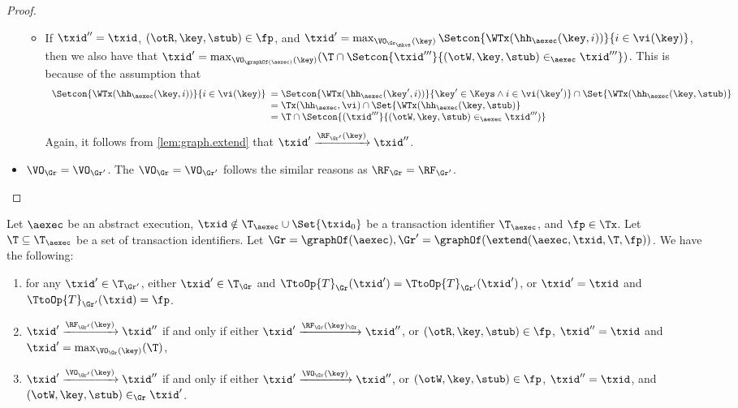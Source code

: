 \begin{proof}
\begin{itemize}
\begin{itemize}
\item If $\txid'' = \txid$, $(\otR, \key, \stub) \in \fp$, and $\txid' = \max_{\VO_{\Gr_\mkvs}(\key)} \Setcon{ \WTx(\hh_{\aexec}(\key, i)) }{ i \in \vi(\key)}$, 
    then we also have that $\txid' = \max_{\VO_{\graphOf(\aexec)}(\key)} (\T \cap \Setcon{ \txid''' }{ (\otW, \key, \stub) \in_{\aexec} \txid'''}) $. 
This is because of the assumption that 
\[
\begin{array}{l}
    \Setcon{\WTx(\hh_{\aexec}(\key, i)) }{ i \in \vi(\key)}
    \begin{array}[t]{l}
    = \Setcon{\WTx(\hh_{\aexec}(\key', i)) }{ \key' \in \Keys \wedge i \in \vi(\key')} \cap \Set{\WTx(\hh_{\aexec}(\key, \stub)} \\
= \Tx(\hh_{\aexec}, \vi) \cap \Set{\WTx(\hh_{\aexec}(\key, \stub)}  \\
= \T \cap \Setcon{(\txid''' }{ (\otW, \key, \stub) \in_{\aexec} \txid''')}
\end{array}
\end{array}
\]
Again, it follows from \cref{lem:graph.extend} that $\txid' \xrightarrow{\RF_{\Gr'}(\key)} \txid''$. 
\end{itemize}
\item \( \VO_{\Gr} = \VO_{\Gr'}\). The \( \VO_{\Gr} = \VO_{\Gr'} \) follows the similar reasons as $\RF_{\Gr} = \RF_{\Gr'}$.
\end{itemize}
\end{proof}

\begin{lemma}
\label{lem:graph.extend}
Let $\aexec$ be an abstract execution, 
$\txid \notin \T_{\aexec} \cup \Set{\txid_0}$ be a transaction identifier $\T_{\aexec}$, and $\fp \in \Tx$. 
Let $\T \subseteq \T_{\aexec}$ be a set of transaction identifiers.
Let $\Gr = \graphOf(\aexec), \Gr' = \graphOf(\extend(\aexec, \txid, \T, \fp))$. 
We have the following: 
\begin{enumerate}
\item for any $\txid' \in \T_{\Gr'}$, either $\txid' \in \T_{\Gr}$ and $\TtoOp{T}_{\Gr}(\txid') = \TtoOp{T}_{\Gr'}(\txid')$, 
or $\txid' = \txid$ and $\TtoOp{T}_{\Gr'}(\txid) = \fp$.
\item $\txid' \xrightarrow{\RF_{\Gr'}(\key)} \txid''$ if and only if either 
$\txid' \xrightarrow{\RF_{\Gr}(\key)_{\Gr}} \txid''$, or $(\otR, \key, \stub) \in \fp$, $\txid'' = \txid$ and 
$\txid' = \max_{\VO_{\Gr}(\key)}(\T)$, 
\item $\txid' \xrightarrow{\VO_{\Gr'}(\key)} \txid''$ if and only if 
either $\txid' \xrightarrow{\VO_{\Gr}(\key)} \txid''$, or $(\otW, \key, \stub) \in \fp$, $\txid'' = \txid$, 
and $(\otW, \key, \stub) \in_{\Gr} \txid'$.
\end{enumerate}
\end{lemma}

